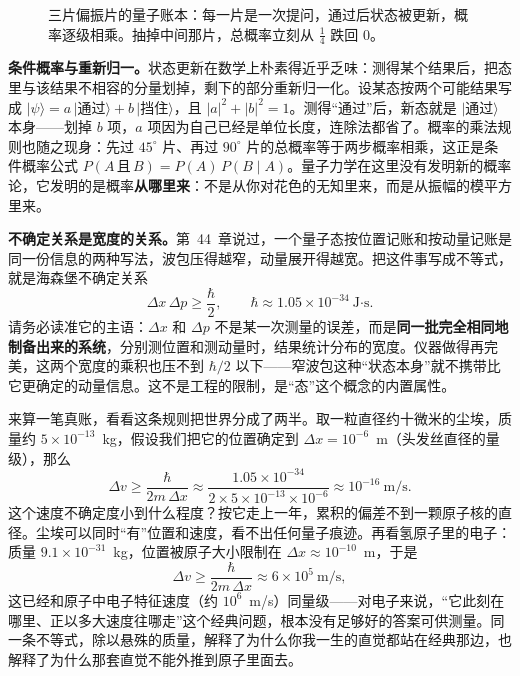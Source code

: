 \begin{figure}[htbp]
\centering
{}
\caption{三片偏振片的量子账本：每一片是一次提问，通过后状态被更新，概率逐级相乘。抽掉中间那片，总概率立刻从 $\tfrac14$ 跌回 $0$。}
\end{figure}

\begin{mathbridge}
\textbf{条件概率与重新归一。}状态更新在数学上朴素得近乎乏味：测得某个结果后，把态里与该结果不相容的分量划掉，剩下的部分重新归一化。设某态按两个可能结果写成 $|\psi\rangle=a\,|\text{通过}\rangle+b\,|\text{挡住}\rangle$，且 $|a|^2+|b|^2=1$。测得“通过”后，新态就是 $|\text{通过}\rangle$ 本身——划掉 $b$ 项，$a$ 项因为自己已经是单位长度，连除法都省了。概率的乘法规则也随之现身：先过 $45^\circ$ 片、再过 $90^\circ$ 片的总概率等于两步概率相乘，这正是条件概率公式 $P(A\,\text{且}\,B)=P(A)\,P(B\mid A)$。量子力学在这里没有发明新的概率论，它发明的是概率\textbf{从哪里来}：不是从你对花色的无知里来，而是从振幅的模平方里来。

\textbf{不确定关系是宽度的关系。}第~44~章说过，一个量子态按位置记账和按动量记账是同一份信息的两种写法，波包压得越窄，动量展开得越宽。把这件事写成不等式，就是海森堡不确定关系
\[
\Delta x\,\Delta p\geq \frac{\hbar}{2},\qquad \hbar\approx 1.05\times10^{-34}\ \text{J·s}.
\]
请务必读准它的主语：$\Delta x$ 和 $\Delta p$ 不是某一次测量的误差，而是\textbf{同一批完全相同地制备出来的系统}，分别测位置和测动量时，结果统计分布的宽度。仪器做得再完美，这两个宽度的乘积也压不到 $\hbar/2$ 以下——窄波包这种“状态本身”就不携带比它更确定的动量信息。这不是工程的限制，是“态”这个概念的内置属性。
\end{mathbridge}

来算一笔真账，看看这条规则把世界分成了两半。取一粒直径约十微米的尘埃，质量约 $5\times10^{-13}$~kg，假设我们把它的位置确定到 $\Delta x=10^{-6}$~m（头发丝直径的量级），那么
\[
\Delta v\geq\frac{\hbar}{2m\,\Delta x}\approx\frac{1.05\times10^{-34}}{2\times5\times10^{-13}\times10^{-6}}\approx10^{-16}\ \text{m/s}.
\]
这个速度不确定度小到什么程度？按它走上一年，累积的偏差不到一颗原子核的直径。尘埃可以同时“有”位置和速度，看不出任何量子痕迹。再看氢原子里的电子：质量 $9.1\times10^{-31}$~kg，位置被原子大小限制在 $\Delta x\approx10^{-10}$~m，于是
\[
\Delta v\geq\frac{\hbar}{2m\,\Delta x}\approx6\times10^{5}\ \text{m/s},
\]
这已经和原子中电子特征速度（约 $10^6$~m/s）同量级——对电子来说，“它此刻在哪里、正以多大速度往哪走”这个经典问题，根本没有足够好的答案可供测量。同一条不等式，除以悬殊的质量，解释了为什么你我一生的直觉都站在经典那边，也解释了为什么那套直觉不能外推到原子里面去。

